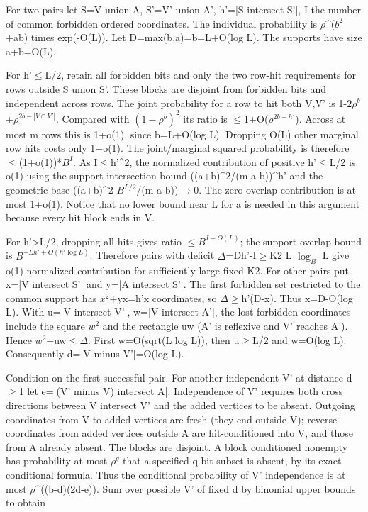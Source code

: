 \documentclass[11pt]{article}
\begin{document}
For two pairs let S=V union A, S'=V' union A', h'=|S intersect S'|, I the number of common forbidden ordered coordinates. The individual probability is $\rho$\textasciicircum{}($b^{2}$+ab) times exp(-O(L)). Let D=max(b,a)=b=L+O(log L). The supports have size a+b=O(L).

For h'\ensuremath{\leq}L/2, retain all forbidden bits and only the two row-hit requirements for rows outside S union S'. These blocks are disjoint from forbidden bits and independent across rows. The joint probability for a row to hit both V,V' is 1-$2\rho^b$+$\rho^{2b-|V\cap V'|}$. Compared with $(1-\rho^b)^2$ its ratio is \ensuremath{\leq}1+O($\rho^{2b-h'}$). Across at most m rows this is 1+o(1), since b=L+O(log L). Dropping O(L) other marginal row hits costs only 1+o(1). The joint/marginal squared probability is therefore \ensuremath{\leq}(1+o(1))*$B^{I}$. As I\ensuremath{\leq}h'\textasciicircum{}2, the normalized contribution of positive h'\ensuremath{\leq}L/2 is o(1) using the support intersection bound ((a+b)\textasciicircum{}2/(m-a-b))\textasciicircum{}h' and the geometric base ((a+b)\textasciicircum{}2 $B^{L/2}$/(m-a-b))\ensuremath{\to}0. The zero-overlap contribution is at most 1+o(1). Notice that no lower bound near L for a is needed in this argument because every hit block ends in V.

For h'>L/2, dropping all hits gives ratio \ensuremath{\leq}$B^{I+O(L)}$; the support-overlap bound is $B^{-Lh'+O(h'\log L)}$. Therefore pairs with deficit $\Delta$=Dh'-I\ensuremath{\geq}K2 L $\log_B$ L give o(1) normalized contribution for sufficiently large fixed K2. For other pairs put x=|V intersect S'| and y=|A intersect S'|. The first forbidden set restricted to the common support has $x^{2}$+yx=h'x coordinates, so $\Delta$\ensuremath{\geq}h'(D-x). Thus x=D-O(log L). With u=|V intersect V'|, w=|V intersect A'|, the lost forbidden coordinates include the square $w^{2}$ and the rectangle uw (A' is reflexive and V' reaches A'). Hence $w^{2}$+uw\ensuremath{\leq}$\Delta$. First w=O(sqrt(L log L)), then u\ensuremath{\geq}L/2 and w=O(log L). Consequently d=|V minus V'|=O(log L).

Condition on the first successful pair. For another independent V' at distance d\ensuremath{\geq}1 let e=|(V' minus V) intersect A|. Independence of V' requires both cross directions between V intersect V' and the added vertices to be absent. Outgoing coordinates from V to added vertices are fresh (they end outside V); reverse coordinates from added vertices outside A are hit-conditioned into V, and those from A already absent. The blocks are disjoint. A block conditioned nonempty has probability at most $\rho^{q}$ that a specified q-bit subset is absent, by its exact conditional formula. Thus the conditional probability of V' independence is at most $\rho$\textasciicircum{}((b-d)(2d-e)). Sum over possible V' of fixed d by binomial upper bounds to obtain
\end{document}
